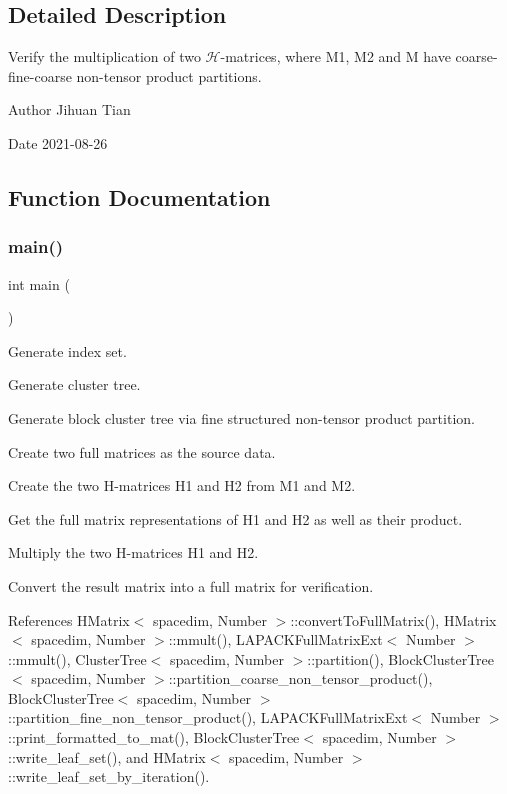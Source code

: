 \subsection{Detailed Description}
Verify the multiplication of two $\mathcal{H}$-\/matrices, where M1, M2 and M have coarse-\/fine-\/coarse non-\/tensor product partitions. 

\begin{DoxyAuthor}{Author}
Jihuan Tian 
\end{DoxyAuthor}
\begin{DoxyDate}{Date}
2021-\/08-\/26 
\end{DoxyDate}


\subsection{Function Documentation}
\mbox{\label{hmatrix-hmatrix-mmult-coarse-fine-coarse-ntp_8cc_ae66f6b31b5ad750f1fe042a706a4e3d4}} 
\subsubsection{\texorpdfstring{main()}{main()}}
{\footnotesize\ttfamily int main (\begin{DoxyParamCaption}{ }\end{DoxyParamCaption})}

Generate index set.

Generate cluster tree.

Generate block cluster tree via fine structured non-\/tensor product partition.

Create two full matrices as the source data.

Create the two H-\/matrices {\ttfamily H1} and {\ttfamily H2} from {\ttfamily M1} and {\ttfamily M2}.

Get the full matrix representations of {\ttfamily H1} and {\ttfamily H2} as well as their product.

Multiply the two H-\/matrices {\ttfamily H1} and {\ttfamily H2}.

Convert the result matrix into a full matrix for verification.

References H\+Matrix$<$ spacedim, Number $>$\+::convert\+To\+Full\+Matrix(), H\+Matrix$<$ spacedim, Number $>$\+::mmult(), L\+A\+P\+A\+C\+K\+Full\+Matrix\+Ext$<$ Number $>$\+::mmult(), Cluster\+Tree$<$ spacedim, Number $>$\+::partition(), Block\+Cluster\+Tree$<$ spacedim, Number $>$\+::partition\+\_\+coarse\+\_\+non\+\_\+tensor\+\_\+product(), Block\+Cluster\+Tree$<$ spacedim, Number $>$\+::partition\+\_\+fine\+\_\+non\+\_\+tensor\+\_\+product(), L\+A\+P\+A\+C\+K\+Full\+Matrix\+Ext$<$ Number $>$\+::print\+\_\+formatted\+\_\+to\+\_\+mat(), Block\+Cluster\+Tree$<$ spacedim, Number $>$\+::write\+\_\+leaf\+\_\+set(), and H\+Matrix$<$ spacedim, Number $>$\+::write\+\_\+leaf\+\_\+set\+\_\+by\+\_\+iteration().

